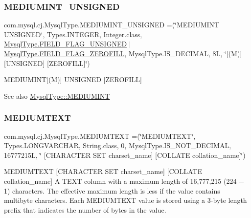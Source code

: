 \subsubsection{\texorpdfstring{M\+E\+D\+I\+U\+M\+I\+N\+T\+\_\+\+U\+N\+S\+I\+G\+N\+ED}{MEDIUMINT\_UNSIGNED}}
{\footnotesize\ttfamily com.\+mysql.\+cj.\+Mysql\+Type.\+M\+E\+D\+I\+U\+M\+I\+N\+T\+\_\+\+U\+N\+S\+I\+G\+N\+ED =(\char`\"{}M\+E\+D\+I\+U\+M\+I\+NT U\+N\+S\+I\+G\+N\+ED\char`\"{}, Types.\+I\+N\+T\+E\+G\+ER, Integer.\+class, \mbox{\hyperlink{enumcom_1_1mysql_1_1cj_1_1_mysql_type_a2c6701614559b1ad9955cdc4ca6337e2}{Mysql\+Type.\+F\+I\+E\+L\+D\+\_\+\+F\+L\+A\+G\+\_\+\+U\+N\+S\+I\+G\+N\+ED}} $\vert$ \mbox{\hyperlink{enumcom_1_1mysql_1_1cj_1_1_mysql_type_abb76a1f2f3dac9a30d1b559b8ba66a48}{Mysql\+Type.\+F\+I\+E\+L\+D\+\_\+\+F\+L\+A\+G\+\_\+\+Z\+E\+R\+O\+F\+I\+LL}}, Mysql\+Type.\+I\+S\+\_\+\+D\+E\+C\+I\+M\+AL, 8\+L, \char`\"{}\mbox{[}(\+M)\mbox{]} \mbox{[}\+U\+N\+S\+I\+G\+N\+E\+D\mbox{]} \mbox{[}\+Z\+E\+R\+O\+F\+I\+L\+L\mbox{]}\char`\"{})}

M\+E\+D\+I\+U\+M\+I\+NT\mbox{[}(M)\mbox{]} U\+N\+S\+I\+G\+N\+ED \mbox{[}Z\+E\+R\+O\+F\+I\+LL\mbox{]}

\begin{DoxySeeAlso}{See also}
\mbox{\hyperlink{enumcom_1_1mysql_1_1cj_1_1_mysql_type_ab95197c592f1fbd01abed94679b373ca}{Mysql\+Type\+::\+M\+E\+D\+I\+U\+M\+I\+NT}} 
\end{DoxySeeAlso}
\mbox{\label{enumcom_1_1mysql_1_1cj_1_1_mysql_type_a8152d42c2961d0e081e76dbbadd7b4f2}} 
\subsubsection{\texorpdfstring{M\+E\+D\+I\+U\+M\+T\+E\+XT}{MEDIUMTEXT}}
{\footnotesize\ttfamily com.\+mysql.\+cj.\+Mysql\+Type.\+M\+E\+D\+I\+U\+M\+T\+E\+XT =(\char`\"{}M\+E\+D\+I\+U\+M\+T\+E\+XT\char`\"{}, Types.\+L\+O\+N\+G\+V\+A\+R\+C\+H\+AR, String.\+class, 0, Mysql\+Type.\+I\+S\+\_\+\+N\+O\+T\+\_\+\+D\+E\+C\+I\+M\+AL, 16777215\+L, \char`\"{} \mbox{[}\+C\+H\+A\+R\+A\+C\+T\+E\+R S\+E\+T charset\+\_\+name\mbox{]} \mbox{[}\+C\+O\+L\+L\+A\+T\+E collation\+\_\+name\mbox{]}\char`\"{})}

M\+E\+D\+I\+U\+M\+T\+E\+XT \mbox{[}C\+H\+A\+R\+A\+C\+T\+ER S\+ET charset\+\_\+name\mbox{]} \mbox{[}C\+O\+L\+L\+A\+TE collation\+\_\+name\mbox{]} A T\+E\+XT column with a maximum length of 16,777,215 (224 − 1) characters. The effective maximum length is less if the value contains multibyte characters. Each M\+E\+D\+I\+U\+M\+T\+E\+XT value is stored using a 3-\/byte length prefix that indicates the number of bytes in the value.

